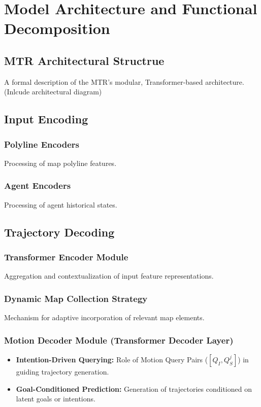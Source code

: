 

\chapter{Model Architecture and Functional Decomposition}
\label{ch:model_architecture}

\section{MTR Architectural Structrue}
\label{sec:model_mtr_architecture}
A formal description of the MTR's modular, Transformer-based architecture. (Inlcude architectural diagram)

\section{Input Encoding}
\label{sec:model_input_encoding}
    \subsection{Polyline Encoders}
    Processing of map polyline features.
	\subsection{Agent Encoders}
    Processing of agent historical states.

\section{Trajectory Decoding}
\label{sec:model_decoding}
    \subsection{Transformer Encoder Module}
    Aggregation and contextualization of input feature representations.
    \subsection{Dynamic Map Collection Strategy}
    Mechanism for adaptive incorporation of relevant map elements.
    \subsection{Motion Decoder Module (Transformer Decoder Layer)}
    \begin{itemize}
        \item \textbf{Intention-Driven Querying:} Role of Motion Query Pairs ($[Q_I, Q_S^j]$) in guiding trajectory generation.
        \item \textbf{Goal-Conditioned Prediction:} Generation of trajectories conditioned on latent goals or intentions.
    \end{itemize}
